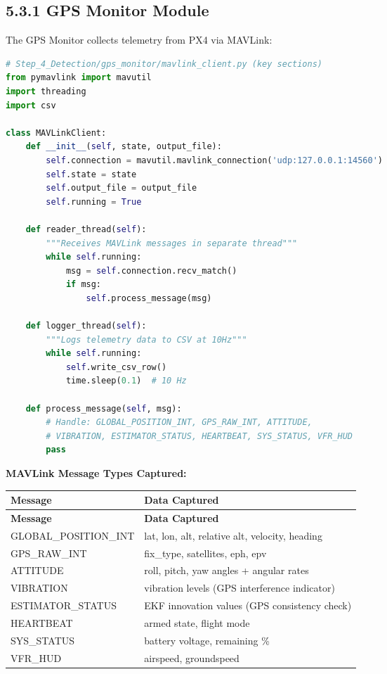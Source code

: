 \documentclass[12pt,a4paper]{article}
\begin{document}
\subsection{5.3.1 GPS Monitor Module}

The GPS Monitor collects telemetry from PX4 via MAVLink:

\begin{lstlisting}[language=python, style=pythonstyle]
# Step_4_Detection/gps_monitor/mavlink_client.py (key sections)
from pymavlink import mavutil
import threading
import csv

class MAVLinkClient:
    def __init__(self, state, output_file):
        self.connection = mavutil.mavlink_connection('udp:127.0.0.1:14560')
        self.state = state
        self.output_file = output_file
        self.running = True
        
    def reader_thread(self):
        """Receives MAVLink messages in separate thread"""
        while self.running:
            msg = self.connection.recv_match()
            if msg:
                self.process_message(msg)
    
    def logger_thread(self):
        """Logs telemetry data to CSV at 10Hz"""
        while self.running:
            self.write_csv_row()
            time.sleep(0.1)  # 10 Hz
    
    def process_message(self, msg):
        # Handle: GLOBAL_POSITION_INT, GPS_RAW_INT, ATTITUDE, 
        # VIBRATION, ESTIMATOR_STATUS, HEARTBEAT, SYS_STATUS, VFR_HUD
        pass
\end{lstlisting}

\textbf{MAVLink Message Types Captured:}
\begin{longtable}{|p{4cm}|p{11cm}|}
\hline
\textbf{Message} & \textbf{Data Captured} \\
\hline
\endfirsthead
\hline
\textbf{Message} & \textbf{Data Captured} \\
\hline
\endhead
\hline
GLOBAL\_POSITION\_INT & lat, lon, alt, relative alt, velocity, heading \\
\hline
GPS\_RAW\_INT & fix\_type, satellites, eph, epv \\
\hline
ATTITUDE & roll, pitch, yaw angles + angular rates \\
\hline
VIBRATION & vibration levels (GPS interference indicator) \\
\hline
ESTIMATOR_STATUS & EKF innovation values (GPS consistency check) \\
\hline
HEARTBEAT & armed state, flight mode \\
\hline
SYS\_STATUS & battery voltage, remaining \% \\
\hline
VFR\_HUD & airspeed, groundspeed \\
\hline
\end{longtable}
\end{document}
